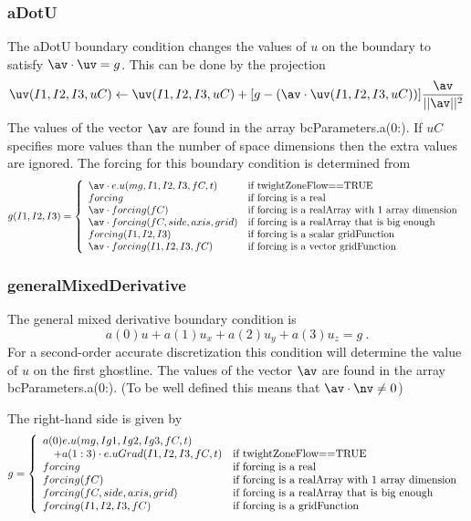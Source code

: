 \subsubsection{aDotU}

The {\ff aDotU} boundary condition changes the values 
of $u$ on the boundary
to satisfy $\av\cdot\uv = g $. This can be done by the projection
\[
        \uv(I1,I2,I3,uC) \leftarrow \uv(I1,I2,I3,uC) + [g-(\av\cdot\uv(I1,I2,I3,uC))] {\av \over ||\av||^2 }
\]
The values of the vector $\av$ are found in the array {\ff bcParameters.a(0:)}.
If $uC$ specifies more values than the number of space dimensions then the extra values are
ignored. The forcing for this boundary condition is determined from
\[
 g(I1,I2,I3) =  \left\{ \begin{array}{ll}
        \av\cdot \true u(mg,I1,I2,I3,fC,t) & \mbox{if twightZoneFlow==TRUE} \\
        forcing              & \mbox{if forcing is a real      } \\
    \av\cdot forcing(fC)           & \mbox{if forcing  is a realArray with 1 array dimension } \\
    \av\cdot forcing(fC,side,axis,grid) & \mbox{if forcing is a realArray that is big enough} \\
        forcing(I1,I2,I3)  & \mbox{if forcing is a scalar gridFunction} \\
        \av\cdot forcing(I1,I2,I3,fC)  & \mbox{if forcing is a vector gridFunction} \\
          \end{array}
  \right.
\]


\subsubsection{generalMixedDerivative}

The general mixed derivative boundary condition is
$$
 a(0) u + a(1) u_x + a(2) u_y + a(3) u_z = g  ~.
$$
For a second-order accurate discretization this condition
will determine the value of $u$ on the first ghostline.
The values of the vector $\av$ are found in the array {\ff bcParameters.a(0:)}.
(To be well defined this means that $\av\cdot\nv \ne 0$)

The right-hand side is given by
\[
g = \left\{ \begin{array}{ll}
          a(0) e. u(mg,Ig1,Ig2,Ig3,fC,t)  & \\ 
             ~~~+ a(1:3)\cdot e. uGrad(I1,I2,I3,fC,t)  & \mbox{if twightZoneFlow==TRUE} \\
    forcing              & \mbox{if forcing is a real      } \\
    forcing(fC)           & \mbox{if forcing  is a realArray with 1 array dimension } \\
    forcing(fC,side,axis,grid) & \mbox{if forcing is a realArray that is big enough} \\
    forcing(I1,I2,I3,fC)  & \mbox{if forcing is a gridFunction} \\
          \end{array}
  \right.
\]


